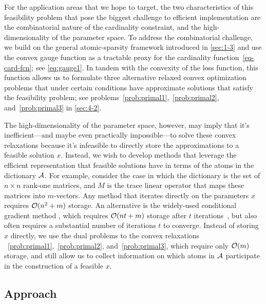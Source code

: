 For the application areas that we hope to target, the two characteristics of this feasibility problem that pose the biggest challenge to efficient implementation are the combinatorial nature of the cardinality constraint, and the high-dimensionality of the parameter space. To address the combinatorial challenge, we build on the general atomic-sparsity framework introduced in \autoref{sec:1-3} and use the convex gauge function as a tractable proxy for the cardinality function~\eqref{eq-card-fcn}; see \eqref{eq:gauge1}. In tandem with the convexity of the loss function, this function allows us to formulate three alternative relaxed convex optimization problems that under certain conditions have approximate solutions that satisfy the feasibility problem; see problems~\eqref{prob:primal1},~\eqref{prob:primal2}, and~\eqref{prob:primal3} in \autoref{sec:4-2}.

The high-dimensionality of the parameter space, however, may imply that it's inefficient---and maybe even practically impossible---to solve these convex relaxations because it's infeasible to directly store the approximations to a feasible solution $x$. Instead, we wish to develop methods that leverage the efficient representation that feasible solutions have in terms of the atoms in the dictionary $\mathcal{A}$. For example, consider the case in which the dictionary is the set of ${n \times n}$ rank-one matrices, and $M$ is the trace linear operator that maps these matrices into $m$-vectors. Any method that iterates directly on the parameters $x$ requires $\mathcal{O}(n^2+m)$ storage. An alternative is the widely-used conditional gradient method \cite{frank1956algorithm}, which requires $\mathcal{O}( n t+m )$ storage after $t$ iterations~\cite{jaggi2013revisiting}, but also often requires a substantial number of iterations $t$ to converge. Instead of storing $x$ directly, we use the dual problems to the convex relaxations ~\eqref{prob:primal1},~\eqref{prob:primal2}, and~\eqref{prob:primal3}, which require only $\mathcal{O}(m)$ storage, and still allow us to collect information on which atoms in $\mathcal{A}$ participate in the construction of a feasible $x$.

\subsection{Approach}

